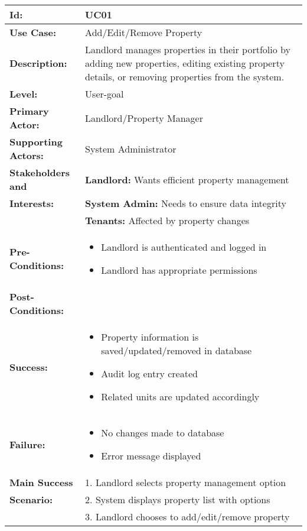 \documentclass[12pt]{article}
\begin{document}
\begin{tabular}{|p{3cm}|p{11cm}|}
\hline
\textbf{Id:} & UC01 \\
\hline
\textbf{Use Case:} & Add/Edit/Remove Property \\
\hline
\textbf{Description:} & Landlord manages properties in their portfolio by adding new properties, editing existing property details, or removing properties from the system. \\
\hline
\textbf{Level:} & User-goal \\
\hline
\textbf{Primary Actor:} & Landlord/Property Manager \\
\hline
\textbf{Supporting Actors:} & System Administrator \\
\hline
\textbf{Stakeholders and} & \textbf{Landlord:} Wants efficient property management \\
\textbf{Interests:} & \textbf{System Admin:} Needs to ensure data integrity \\
& \textbf{Tenants:} Affected by property changes \\
\hline
\textbf{Pre-Conditions:} & 
\begin{itemize}
    \item Landlord is authenticated and logged in
    \item Landlord has appropriate permissions
\end{itemize} \\
\hline
\textbf{Post-Conditions:} & \\
\textbf{Success:} & 
\begin{itemize}
    \item Property information is saved/updated/removed in database
    \item Audit log entry created
    \item Related units are updated accordingly
\end{itemize} \\
\textbf{Failure:} & 
\begin{itemize}
    \item No changes made to database
    \item Error message displayed
\end{itemize} \\
\hline
\textbf{Main Success} & 1. Landlord selects property management option \\
\textbf{Scenario:} & 2. System displays property list with options \\
& 3. Landlord chooses to add/edit/remove property \\

\end{tabular}
\end{document}

